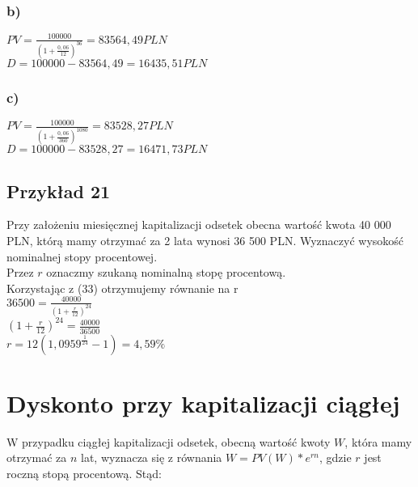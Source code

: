 \documentclass{article}
\begin{document}
\subsubsection{b)}

$ PV = \frac{100 000}{(1 + \frac{0,06}{12})^{36}} = 83 564,49 PLN $\\

$ D = 100 000 - 83 564,49 = 16 435,51 PLN $

\subsubsection{c)}

$ PV = \frac{100 000}{(1 + \frac{0,06}{360})^{1080}} = 83 528,27 PLN $\\

$ D = 100 000 - 83 528,27 = 16 471,73 PLN $

\subsection{Przykład 21}

Przy założeniu miesięcznej kapitalizacji odsetek obecna wartość kwota 40 000 PLN, którą mamy otrzymać za 2 lata wynosi 36 500 PLN. Wyznaczyć wysokość nominalnej stopy procentowej.\\

Przez $ r $ oznaczmy szukaną nominalną stopę procentową.\\

Korzystając z (33) otrzymujemy równanie na r\\

$ 36 500 = \frac{40 000}{(1 + \frac{r}{12})^{24}} $\\

$  (1 + \frac{r}{12})^{24} = \frac{40 000}{36 500} $\\

$ r = 12(1,0959^{\frac{1}{24}} - 1) = 4,59\% $

\newpage

%
%

\section{Dyskonto przy kapitalizacji ciągłej}

W przypadku ciągłej kapitalizacji odsetek, obecną wartość kwoty $ W $, która mamy otrzymać za $ n $ lat, wyznacza się z równania $ W = PV(W) * e^{rn} $, gdzie $ r $ jest roczną stopą procentową. Stąd:
\end{document}
